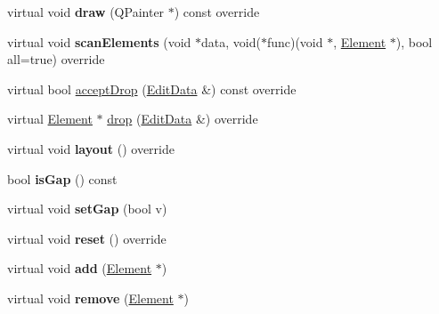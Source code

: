 \begin{DoxyCompactItemize}
\item 
\mbox{\label{class_ms_1_1_rest_a7e0f2a006545bf41d8aec8ddb3cefaf6}} 
virtual void {\bfseries draw} (Q\+Painter $\ast$) const override
\item 
\mbox{\label{class_ms_1_1_rest_ab26fe0a2098bf8e3ce0c21dc94804c93}} 
virtual void {\bfseries scan\+Elements} (void $\ast$data, void($\ast$func)(void $\ast$, \hyperlink{class_ms_1_1_element}{Element} $\ast$), bool all=true) override
\item 
virtual bool \hyperlink{class_ms_1_1_rest_a0b2f2d3aec34bcd9ce047b60577d12df}{accept\+Drop} (\hyperlink{class_ms_1_1_edit_data}{Edit\+Data} \&) const override
\item 
virtual \hyperlink{class_ms_1_1_element}{Element} $\ast$ \hyperlink{class_ms_1_1_rest_a4dec6c49aaf416289c5e2f78a2074c64}{drop} (\hyperlink{class_ms_1_1_edit_data}{Edit\+Data} \&) override
\item 
\mbox{\label{class_ms_1_1_rest_ab92347801077c989c3cfe0cc8caa6b44}} 
virtual void {\bfseries layout} () override
\item 
\mbox{\label{class_ms_1_1_rest_ac3e5421836f4d0788e1b0abb44d860b1}} 
bool {\bfseries is\+Gap} () const
\item 
\mbox{\label{class_ms_1_1_rest_a7e44f514c6bbaacaad6c8b541f736e04}} 
virtual void {\bfseries set\+Gap} (bool v)
\item 
\mbox{\label{class_ms_1_1_rest_a2f082e1f625e53f9170ee50380fa5623}} 
virtual void {\bfseries reset} () override
\item 
\mbox{\label{class_ms_1_1_rest_aab9dd0c2ef5955ee4a2e99c3866213c1}} 
virtual void {\bfseries add} (\hyperlink{class_ms_1_1_element}{Element} $\ast$)
\item 
\mbox{\label{class_ms_1_1_rest_ab2bcfaa33d0958343bfdc08e5b2a0ba3}} 
virtual void {\bfseries remove} (\hyperlink{class_ms_1_1_element}{Element} $\ast$)
\item 
\mbox{\label{class_ms_1_1_rest_a2b7b1ce384363656a43064191da4b250}} 

\end{DoxyCompactItemize}
